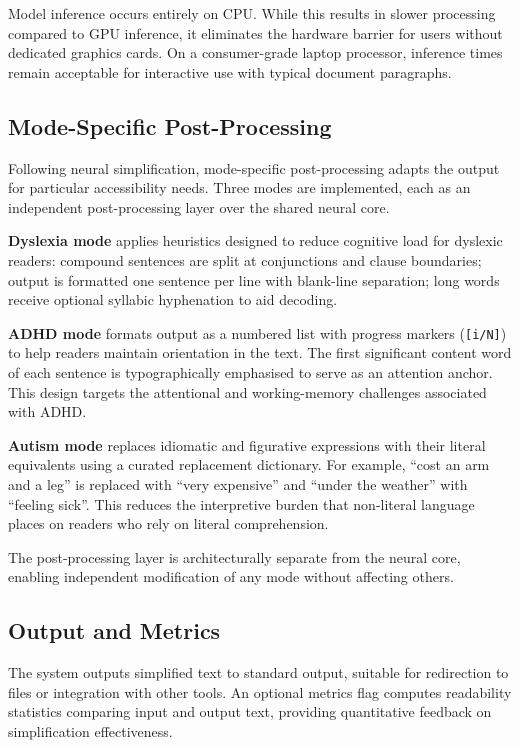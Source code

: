 \documentclass[11pt]{article}
\begin{document}
Model inference occurs entirely on CPU. While this results in slower processing compared to GPU inference, it eliminates the hardware barrier for users without dedicated graphics cards. On a consumer-grade laptop processor, inference times remain acceptable for interactive use with typical document paragraphs.

\subsection{Mode-Specific Post-Processing}

Following neural simplification, mode-specific post-processing adapts the output for particular accessibility needs. Three modes are implemented, each as an independent post-processing layer over the shared neural core.

\textbf{Dyslexia mode} applies heuristics designed to reduce cognitive load for dyslexic readers: compound sentences are split at conjunctions and clause boundaries; output is formatted one sentence per line with blank-line separation; long words receive optional syllabic hyphenation to aid decoding.

\textbf{ADHD mode} formats output as a numbered list with progress markers (\texttt{[i/N]}) to help readers maintain orientation in the text. The first significant content word of each sentence is typographically emphasised to serve as an attention anchor. This design targets the attentional and working-memory challenges associated with ADHD.

\textbf{Autism mode} replaces idiomatic and figurative expressions with their literal equivalents using a curated replacement dictionary. For example, ``cost an arm and a leg'' is replaced with ``very expensive'' and ``under the weather'' with ``feeling sick''. This reduces the interpretive burden that non-literal language places on readers who rely on literal comprehension.

The post-processing layer is architecturally separate from the neural core, enabling independent modification of any mode without affecting others.

\subsection{Output and Metrics}

The system outputs simplified text to standard output, suitable for redirection to files or integration with other tools. An optional metrics flag computes readability statistics comparing input and output text, providing quantitative feedback on simplification effectiveness.
\end{document}
